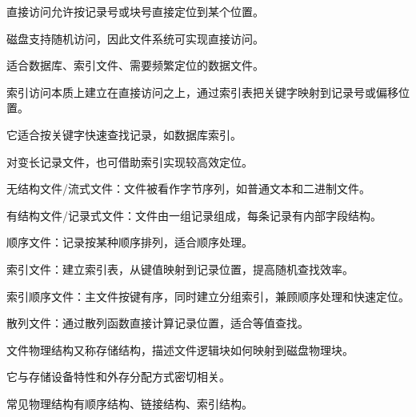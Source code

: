 \begin{points}
  \item 直接访问允许按记录号或块号直接定位到某个位置。
  \item 磁盘支持随机访问，因此文件系统可实现直接访问。
  \item 适合数据库、索引文件、需要频繁定位的数据文件。
\end{points}


\begin{points}
  \item 索引访问本质上建立在直接访问之上，通过索引表把关键字映射到记录号或偏移位置。
  \item 它适合按关键字快速查找记录，如数据库索引。
  \item 对变长记录文件，也可借助索引实现较高效定位。
\end{points}


\begin{points}
  \item 无结构文件/流式文件：文件被看作字节序列，如普通文本和二进制文件。
  \item 有结构文件/记录式文件：文件由一组记录组成，每条记录有内部字段结构。
  \item 顺序文件：记录按某种顺序排列，适合顺序处理。
  \item 索引文件：建立索引表，从键值映射到记录位置，提高随机查找效率。
  \item 索引顺序文件：主文件按键有序，同时建立分组索引，兼顾顺序处理和快速定位。
  \item 散列文件：通过散列函数直接计算记录位置，适合等值查找。
\end{points}


\begin{points}
  \item 文件物理结构又称存储结构，描述文件逻辑块如何映射到磁盘物理块。
  \item 它与存储设备特性和外存分配方式密切相关。
  \item 常见物理结构有顺序结构、链接结构、索引结构。
\end{points}


